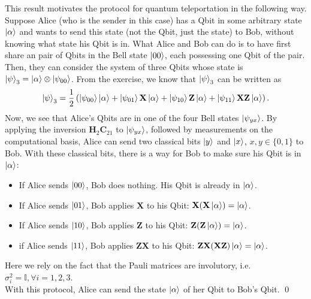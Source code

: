 \documentclass{book}
\theoremstyle{definition}
\newcommand{\al}{\alpha}
\newcommand{\X}{\mathbf{X}}
\newcommand{\f}[2]{\frac{#1}{#2}}
\newcommand{\lp}{\left(}
\newcommand{\rp}{\right)}
\newcommand{\Id}{\mathbb{I}}
\newcommand{\Z}{\mathbf{Z}}
\newcommand{\had}{\mathbf{H}}
\begin{document}
This result motivates the protocol for quantum teleportation in the following way. Suppose Alice (who is the sender in this case) has a Qbit in some arbitrary state $\ket{\al}$ and wants to send this state (not the Qbit, just the state) to Bob, without knowing what state his Qbit is in. What Alice and Bob can do is to have first share an pair of Qbits in the Bell state $\ket{00}$, each possessing one Qbit of the pair.  Then, they can consider the system of three Qbits whose state is $\ket{\psi}_3 = \ket{\al} \otimes \ket{\psi_{00}}$. From the exercise, we know that $\ket{\psi}_3$ can be written as
\begin{align}
\ket{\psi}_3 = \f{1}{2} \lp \ket{\psi_{00}}\ket{\al} + \ket{\psi_{01}}\X\ket{\al} + \ket{\psi_{10}}\Z\ket{\al} + \ket{\psi_{11}}\X \Z \ket{\al} \rp.
\end{align}
Now, we see that Alice's Qbits are in one of the four Bell states $\ket{\psi_{yx}}$. By applying the inversion $\had_2 \mathbf{C}_{21}$ to $\ket{\psi_{yx}}$, followed by measurements on the computational basis, Alice can send two classical bits $\ket{y}$ and $\ket{x}$, $x,y \in \{0,1\}$ to Bob. With these classical bits, there is a way for Bob to make sure his Qbit is in $\ket{\al}$:
\begin{itemize}
	\item If Alice sends $\ket{00}$,  Bob does nothing. His Qbit is already in $\ket{\al}$.
	\item If  Alice sends $\ket{01}$,  Bob applies $\X$ to his Qbit: $\X (\X \ket{\al}) = \ket{\al}$. 
	\item If Alice sends $\ket{10}$,  Bob applies $\Z$ to his Qbit: $\Z (\Z \ket{\al}) = \ket{\al}$.
	\item if Alice sends $\ket{11}$,  Bob applies $\Z\X$ to his Qbit: $\Z\X (\X\Z)\ket{\al} = \ket{\al}$.
\end{itemize}  
Here we rely on the fact that the Pauli matrices are involutory, i.e. $\sigma_i^2 = \Id, \forall i = 1,2,3$. \\

With this protocol, Alice can send the state $\ket{\al}$ of her Qbit to Bob's Qbit.  \qed
\end{document}
